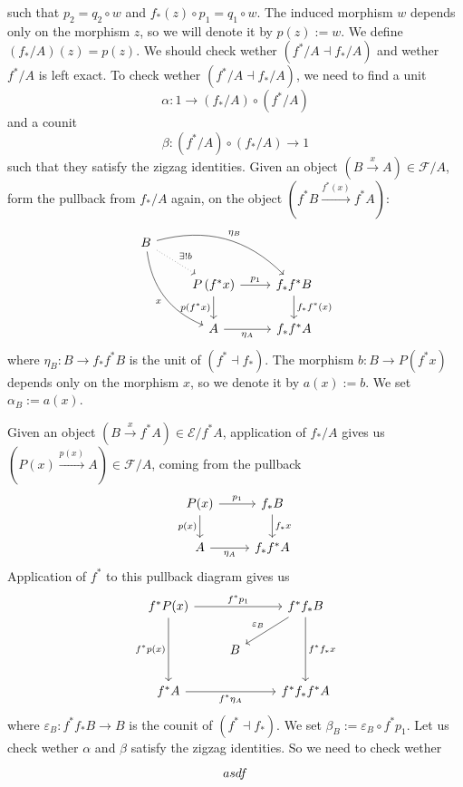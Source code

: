such that $p_2 = q_2 \circ w$ and $f_*(z) \circ p_1 = q_1 \circ w$. The induced morphism $w$ depends only on the morphism $z$, so we will denote it by $p(z) := w$. We define $(f_*/A)(z) = p(z)$.
We should check wether $\left( f^*/A \dashv f_*/A \right)$ and wether $f^*/A$ is left exact. To check wether $\left( f^*/A \dashv f_*/A \right)$, we need to find a unit
\[ \alpha : 1 \to \left(f_*/A\right) \circ \left( f^*/A \right) \]
and a counit
\[ \beta : \left( f^*/A \right) \circ \left( f_*/A \right) \to 1 \]
such that they satisfy the zigzag identities. 
Given an object $(B \xrightarrow{x} A) \in \mathscr{F}/A$, form the pullback from $f_*/A$ again, on the object $(f^*B \xrightarrow{f^*(x)} f^*A)$:
\[\begin{tikzcd}
B \arrow[dr, dotted, "\exists! b"] \arrow[ddr, bend right, swap, "x"] \arrow[drr, bend left, "\eta_B"] \\
& P\left(f^*x\right) \arrow[r, "p_1"] \arrow[d, swap, "p\left(f^*x\right)"] & f_*f^*B \arrow[d, "f_*f^*(x)"] \\
& A \arrow[r, swap, "\eta_A"] & f_*f^*A
\end{tikzcd}\]
where $\eta_B : B \to f_* f^* B$ is the unit of $(f^* \dashv f_*)$. The morphism $b : B \to P(f^*x)$ depends only on the morphism $x$, so we denote it by $a(x) := b$. We set $\alpha_B := a(x)$. 

Given an object $(B \xrightarrow{x} f^*A) \in \mathscr{E}/f^*A$, application of $f_*/A$ gives us $\left(P(x) \xrightarrow{p(x)} A \right) \in \mathscr{F}/A$, coming from the pullback
\[\begin{tikzcd}
P(x) \arrow[r, "p_1"] \arrow[d, swap, "p(x)"] & f_*B \arrow[d, "f_*x"] \\
A \arrow[r, swap, "\eta_A"] & f_*f^*A
\end{tikzcd}\]
Application of $f^*$ to this pullback diagram gives us
\[\begin{tikzcd}
f^*P(x) \arrow[rr, "f^*p_1"] \arrow[dd, swap, "f^*p(x)"] & & f^*f_*B \arrow[dd, "f^*f_*x"] \arrow[dl, swap, "\varepsilon_B"] \\
 & B & \\
f^*A \arrow[rr, swap, "f^*\eta_A"] & & f^*f_*f^*A
\end{tikzcd}\]
where $\varepsilon_B : f^*f_*B \to B$ is the counit of $(f^* \dashv f_*)$. We set $\beta_B := \varepsilon_B \circ f^*p_1$. Let us check wether $\alpha$ and $\beta$ satisfy the zigzag identities. So we need to check wether
\[\begin{tikzcd}
asdf
\end{tikzcd}\]

